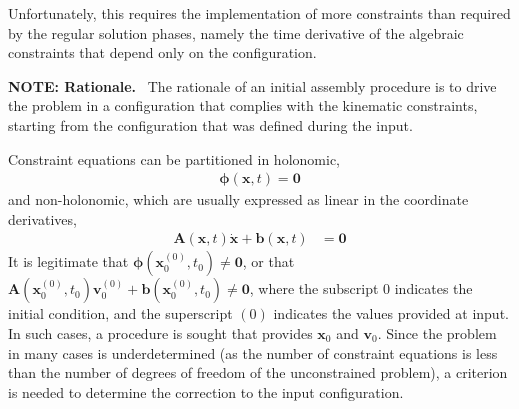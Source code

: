 \documentclass[10pt,fleqn,subeqn]{report}
\newcommand{\T}[1]{\bm{#1}}
\newcommand{\TT}[1]{\bm{#1}}
\begin{document}
Unfortunately, this requires the implementation of more constraints
than required by the regular solution phases, namely the time derivative
of the algebraic constraints that depend only on the configuration.

\bigskip



\textbf{NOTE: Rationale.} \
The rationale of an initial assembly procedure is to drive the problem
in a configuration that complies with the kinematic constraints,
starting from the configuration that was defined during the input.

Constraint equations can be partitioned in holonomic,
\begin{align}
	\T{\phi}(\T{x}, t) = \T{0}
\end{align}
and non-holonomic, which are usually expressed as linear in the coordinate derivatives,
\begin{align}
	\TT{A}(\T{x}, t) \dot{\T{x}} + \T{b}(\T{x}, t) &= \T{0}
\end{align}
It is legitimate that $\T{\phi}(\T{x}_0^{(0)}, t_0) \neq \T{0}$,
or that $\TT{A}(\T{x}_0^{(0)}, t_0) \T{v}_0^{(0)} + \T{b}(\T{x}_0^{(0)}, t_0) \neq \T{0}$,
where the subscript $0$ indicates the initial condition,
and the superscript $(0)$ indicates the values provided at input.
In such cases, a procedure is sought that provides $\T{x}_0$ and $\T{v}_0$.
Since the problem in many cases is underdetermined
(as the number of constraint equations is less than the number
of degrees of freedom of the unconstrained problem),
a criterion is needed to determine the correction to the input configuration.
\end{document}
